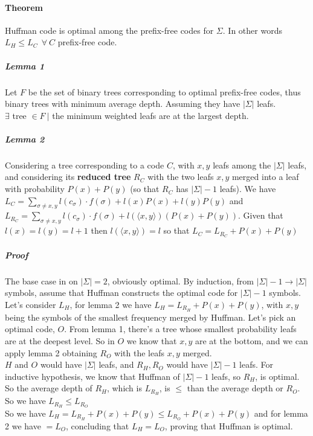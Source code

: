 \documentclass[10pt]{report}
\begin{document}
\paragraph{Theorem} Huffman code is optimal among the prefix-free codes for $\Sigma$. In other words $L_H \leq L_C\:\:\forall\:C$ prefix-free code.
\subparagraph{Lemma 1} Let $F$ be the set of binary trees corresponding to optimal prefix-free codes, thus binary trees with minimum average depth. Assuming they have $|\Sigma|$ leafs.\\
$\exists$ tree $\in F\:|$ the minimum weighted leafs are at the largest depth.
\subparagraph{Lemma 2} Considering a tree corresponding to a code $C$, with $x,y$ leafs among the $|\Sigma|$ leafs, and considering its \textbf{reduced tree} $R_C$ with the two leafs $x,y$ merged into a leaf with probability $P(x) + P(y)$ (so that $R_C$ has $|\Sigma|-1$ leafs). We have $L_C  = \sum_{\sigma\neq x,y} l(c_\sigma)\cdot f(\sigma)+l(x)P(x) + l(y)P(y)$ and $L_{R_C}  = \sum_{\sigma\neq x,y} l(c_\sigma)\cdot f(\sigma)+l(\langle x,y\rangle)(P(x)+P(y))$. Given that $l(x) = l(y) = l + 1$ then $l(\langle x,y\rangle) = l$ so that $L_C = L_{R_C} + P(x) + P(y)$
\subparagraph{Proof} The base case in on $|\Sigma| = 2$, obviously optimal. By induction, from $|\Sigma|-1 \rightarrow |\Sigma|$ symbols, assume that Huffman constructs the optimal code for $|\Sigma|-1$ symbols.\\
Let's consider $L_H$, for lemma 2 we have $L_H = L_{R_H} + P(x) + P(y)$, with $x,y$ being the symbols of the smallest frequency merged by Huffman. Let's pick an optimal code, $O$. From lemma 1, there's a tree whose smallest probability leafs are at the deepest level. So in $O$ we know that $x,y$ are at the bottom, and we can apply lemma 2 obtaining $R_O$ with the leafs $x,y$ merged.\\
$H$ and $O$ would have $|\Sigma|$ leafs, and $R_H,R_O$ would have $|\Sigma|-1$ leafs. For inductive hypothesis, we know that Huffman of $|\Sigma|-1$ leafs, so $R_H$, is optimal. So the average depth of $R_H$, which is $L_{R_H}$, is $\leq$ than the average depth or $R_O$. So we have $L_{R_H}\leq L_{R_O}$\\
So we have $L_H = L_{R_H} + P(x) + P(y) \leq L_{R_O} + P(x) + P(y)$ and for lemma 2 we have $= L_O$, concluding that $L_H = L_O$, proving that Huffman is optimal.
\end{document}
